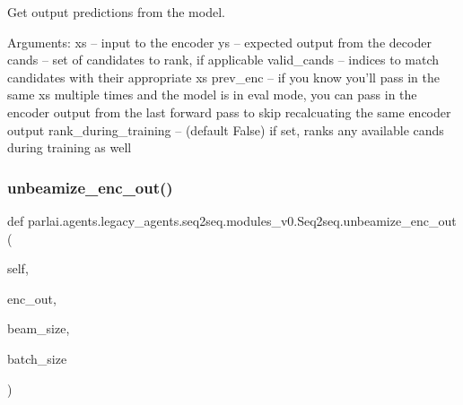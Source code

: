\begin{DoxyVerb}Get output predictions from the model.

Arguments:
xs -- input to the encoder
ys -- expected output from the decoder
cands -- set of candidates to rank, if applicable
valid_cands -- indices to match candidates with their appropriate xs
prev_enc -- if you know you'll pass in the same xs multiple times and
    the model is in eval mode, you can pass in the encoder output from
    the last forward pass to skip recalcuating the same encoder output
rank_during_training -- (default False) if set, ranks any available
    cands during training as well
\end{DoxyVerb}
 \mbox{\label{classparlai_1_1agents_1_1legacy__agents_1_1seq2seq_1_1modules__v0_1_1Seq2seq_a0c0270e1e4c3f72bca49d3752d90baab}} 
\subsubsection{\texorpdfstring{unbeamize\+\_\+enc\+\_\+out()}{unbeamize\_enc\_out()}}
{\footnotesize\ttfamily def parlai.\+agents.\+legacy\+\_\+agents.\+seq2seq.\+modules\+\_\+v0.\+Seq2seq.\+unbeamize\+\_\+enc\+\_\+out (\begin{DoxyParamCaption}\item[{}]{self,  }\item[{}]{enc\+\_\+out,  }\item[{}]{beam\+\_\+size,  }\item[{}]{batch\+\_\+size }\end{DoxyParamCaption})}

\mbox{\label{classparlai_1_1agents_1_1legacy__agents_1_1seq2seq_1_1modules__v0_1_1Seq2seq_adab65a09af78ad2a9bcdca010f0d0fe6}} 
